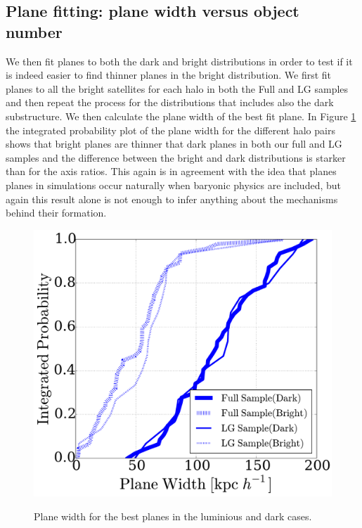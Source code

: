 \subsection{Plane fitting: plane width versus object number}
\label{DarkBright}
We then fit planes to both the dark and bright distributions in order
to test if it is indeed easier to find thinner planes in the bright
distribution.  
We first fit planes to all the bright satellites for each halo in both
the Full and LG samples and then repeat the process for the
distributions that includes also the dark substructure. 
We then calculate the plane width of the best fit plane. %
In Figure \ref{fig:plane_width} the integrated probability plot of the
plane width for the different halo pairs shows that bright planes are
thinner that dark planes in both our full and LG samples and the
difference between the bright and dark distributions is starker than
for the axis ratios.  
This again is in agreement with the idea that planes planes in
simulations occur naturally when baryonic physics are included, but
again this result alone is not enough to infer anything about the
mechanisms behind their formation.\\  

\begin{figure}
\includegraphics[width=\hsize]{plane_width.pdf}\\
\caption{Plane width for the best planes in the luminious and dark cases.}
\label{fig:plane_width}
\end{figure}

